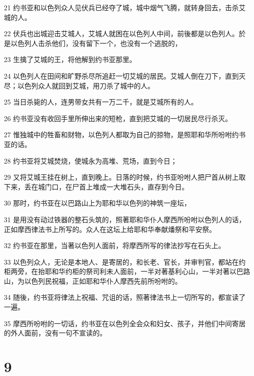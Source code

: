 \par 21 约书亚和以色列众人见伏兵已经夺了城，城中烟气飞腾，就转身回去，击杀艾城的人。
\par 22 伏兵也出城迎击艾城人，艾城人就困在以色列人中间，前後都是以色列人。於是以色列人击杀他们，没有留下一个，也没有一个逃脱的，
\par 23 生擒了艾城的王，将他解到约书亚那里。
\par 24 以色列人在田间和旷野杀尽所追赶一切艾城的居民。艾城人倒在刀下，直到灭尽；以色列众人就回到艾城，用刀杀了城中的人。
\par 25 当日杀毙的人，连男带女共有一万二千，就是艾城所有的人。
\par 26 约书亚没有收回手里所伸出来的短枪，直到把艾城的一切居民尽行杀灭。
\par 27 惟独城中的牲畜和财物，以色列人都取为自己的掠物，是照耶和华所吩咐约书亚的话。
\par 28 约书亚将艾城焚烧，使城永为高堆、荒场，直到今日；
\par 29 又将艾城王挂在树上，直到晚上。日落的时候，约书亚吩咐人把尸首从树上取下来，丢在城门口，在尸首上堆成一大堆石头，直存到今日。
\par 30 那时，约书亚在以巴路山上为耶和华以色列的神筑一座坛，
\par 31 是用没有动过铁器的整石头筑的，照著耶和华仆人摩西所吩咐以色列人的话，正如摩西律法书上所写的。众人在这坛上给耶和华奉献燔祭和平安祭。
\par 32 约书亚在那里，当著以色列人面前，将摩西所写的律法抄写在石头上。
\par 33 以色列众人，无论是本地人、是寄居的，和长老、官长，并审判官，都站在约柜两旁，在抬耶和华约柜的祭司利未人面前，一半对著基利心山，一半对著以巴路山，为以色列民祝福，正如耶和华仆人摩西先前所吩咐的。
\par 34 随後，约书亚将律法上祝福、咒诅的话，照著律法书上一切所写的，都宣读了一遍。
\par 35 摩西所吩咐的一切话，约书亚在以色列全会众和妇女、孩子，并他们中间寄居的外人面前，没有一句不宣读的。

\chapter{9}

